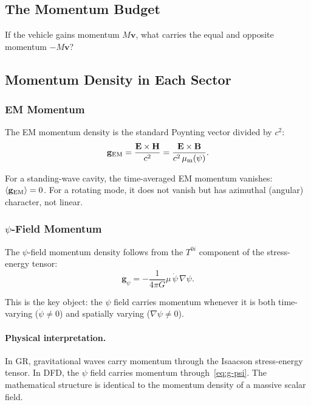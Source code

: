 \documentclass[aps,prd,twocolumn,superscriptaddress,floatfix,nofootinbib]{revtex4-2}
\newcommand{\mufunction}{\mu}
\begin{document}
\subsection{The Momentum Budget}

\begin{tcolorbox}[colback=green!5!white, colframe=green!60!black,
title=Critical Question: What Carries the Recoil Momentum?]
If the vehicle gains momentum $M\mathbf{v}$, what carries the equal
and opposite momentum $-M\mathbf{v}$?
\end{tcolorbox}

\subsection{Momentum Density in Each Sector}

\subsubsection{EM Momentum}

The EM momentum density is the standard Poynting vector divided by $c^2$:
\begin{equation}
\mathbf{g}_{\rm EM} = \frac{\mathbf{E}\times\mathbf{H}}{c^2}
= \frac{\mathbf{E}\times\mathbf{B}}{c^2\,\mu_{\rm m}(\psi)}.
\label{eq:g-EM}
\end{equation}

For a standing-wave cavity, the time-averaged EM momentum vanishes:
$\langle\mathbf{g}_{\rm EM}\rangle = 0$. For a rotating mode, it does
not vanish but has azimuthal (angular) character, not linear.

\subsubsection{$\psi$-Field Momentum}

The $\psi$-field momentum density follows from the $T^{0i}$ component
of the stress-energy tensor:
\begin{equation}
\mathbf{g}_\psi = -\frac{1}{4\pi G}\mufunction\,\dot\psi\,\nabla\psi.
\label{eq:g-psi}
\end{equation}

This is the key object: the $\psi$ field carries momentum whenever
it is both time-varying ($\dot\psi \neq 0$) and spatially varying
($\nabla\psi \neq 0$).

\paragraph{Physical interpretation.} In GR, gravitational waves carry
momentum through the Isaacson stress-energy tensor. In DFD, the $\psi$
field carries momentum through~\eqref{eq:g-psi}. The mathematical
structure is identical to the momentum density of a massive scalar field.
\end{document}
